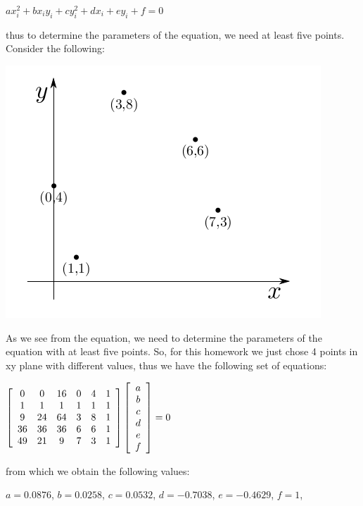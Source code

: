 \documentclass[]{article}
\begin{document}
\centerline {$ax_{i}^2 + bx_{i}y_{i} + cy_{i}^2 + dx_{i} + ey_{i} + f = 0$ }
\vspace{0.4em}

thus to determine the parameters of the equation, we need at least five points. Consider the following: 

\centerline {
	\includegraphics[scale=0.5]{scr2}
}

As we see from the equation, we need to determine the parameters of the equation with at least five points. So, for this homework we just chose 4 points in xy plane with different values, thus we have the following set of equations:

\centerline {
	$\left[ {\begin{array}{*{20}c}
			0 & 0 & 16 & 0 & 4 & 1 \\
			1 & 1 & 1  & 1 & 1 & 1 \\
			9 & 24 & 64  & 3 & 8 & 1 \\
			36 & 36 & 36  & 6 & 6 & 1 \\
			49 & 21 & 9  & 7 & 3 & 1\\   
	\end{array} } \right] 
	\left[ {\begin{array}{*{20}c}
			a \\ 
			b \\ 
			c \\ 
			d \\ 
			e \\ 
			f    
	\end{array} } \right] = 0 $
}

from which we obtain the following values:

\centerline {
	$a = 0.0876$, $b = 0.0258$, $c = 0.0532$, $d = -0.7038$, $e = -0.4629$, $f = 1$,  
}
\end{document}
